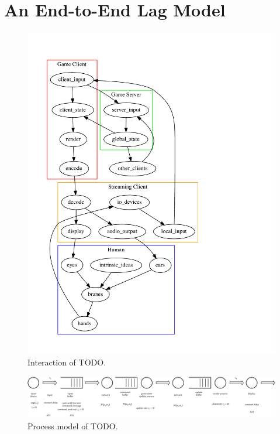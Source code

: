 \section{An End-to-End Lag Model}
\label{sec:model}


\begin{figure}[!t]
	\centering
	\includegraphics[width=1.0\columnwidth]{../models/cycle.pdf}
	\caption{Interaction of TODO.}
\label{fig:component-model}
\end{figure}

\begin{figure}[!t]
	\centering
	\includegraphics[width=1.0\columnwidth]{../models/e2e-lag-model.pdf}
	\caption{Process model of TODO.}
\label{fig:queuing-model}
\end{figure}




